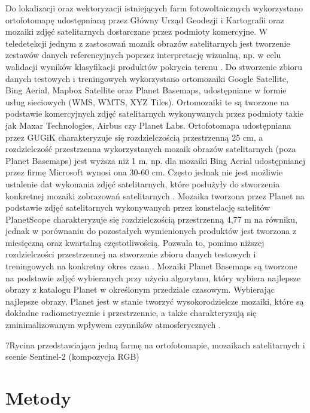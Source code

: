 \documentclass{amuthesis}
\begin{document}
Do lokalizacji oraz wektoryzacji istniejących farm fotowoltaicznych
wykorzystano ortofotomapę udostępnianą przez Główny Urząd Geodezji i
Kartografii oraz mozaiki zdjęć satelitarnych dostarczane przez podmioty
komercyjne. W teledetekcji jednym z zastosowań mozaik obrazów
satelitarnych jest tworzenie zestawów danych referencyjnych poprzez
interpretację wizualną, np. w celu walidacji wyników klasyfikacji
produktów pokrycia terenu \autocite{lesiv_2018_sat_imagery_mosaics}. Do
stworzenie zbioru danych testowych i treningowych wykorzystano
ortomozaiki Google Satellite, Bing Aerial, Mapbox Satellite oraz Planet
Basemaps, udostępniane w formie usług sieciowych (WMS, WMTS, XYZ Tiles).
Ortomozaiki te są tworzone na podstawie komercyjnych zdjęć satelitarnych
wykonywanych przez podmioty takie jak Maxar Technologies, Airbus czy
Planet Labs. Ortofotomapa udostępniana przez GUGiK charakteryzuje się
rozdzielczością przestrzenną 25 cm, a rozdzielczość przestrzenna
wykorzystanych mozaik obrazów satelitarnych (poza Planet Basemaps) jest
wyższa niż 1 m, np. dla mozaiki Bing Aerial udostępnianej przez firmę
Microsoft wynosi ona 30-60 cm. Często jednak nie jest możliwie ustalenie
dat wykonania zdjęć satelitarnych, które posłużyły do stworzenia
konkretnej mozaiki zobrazowań satelitarnych
\autocite{lesiv_2018_sat_imagery_mosaics}. Mozaika tworzona przez Planet
na podstawie zdjęć satelitarnych wykonywanych przez konstelację
satelitów PlanetScope charakteryzuje się rozdzielczością przestrzenną
4,77 m na równiku, jednak w porównaniu do pozostałych wymienionych
produktów jest tworzona z miesięczną oraz kwartalną częstotliwością.
Pozwala to, pomimo niższej rozdzielczości przestrzennej na stworzenie
zbioru danych testowych i treningowych na konkretny okres czasu
\autocite{planet_2019_basemaps}. Mozaiki Planet Basemaps są tworzone na
podstawie zdjęć wybieranych przy użyciu algorytmu, który wybiera
najlepsze obrazy z katalogu Planet w określonym przedziale czasowym.
Wybierając najlepsze obrazy, Planet jest w stanie tworzyć
wysokorodzielcze mozaiki, które są dokładne radiometrycznie i
przestrzennie, a także charakteryzują się zminimalizowanym wpływem
czynników atmosferycznych \autocite{planet_2019_basemaps}.

?Rycina przedstawiająca jedną farmę na ortofotomapie, mozaikach
satelitarnych i scenie Sentinel-2 (kompozycja RGB)


\hypertarget{sec-metody}{%
\chapter{Metody}\label{sec-metody}}
\end{document}
